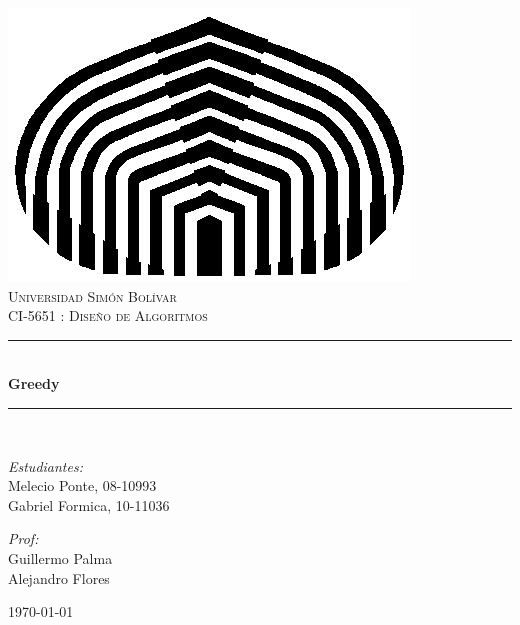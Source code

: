\documentclass[a4paper,14pt,spanish]{article}
\newcommand{\HRule}{\rule{\linewidth}{0.5mm}}
\begin{document}
\begin{titlepage}
\begin{center}
\includegraphics[scale=0.25]{res/USB.jpg}~\\[1cm]

\textsc{\LARGE Universidad Simón Bolívar}\\[1.5cm]
\textsc{\Large CI-5651 : Diseño de Algoritmos}\\[1.5cm]

\HRule \\[0.4cm]
{ \huge \bfseries Greedy\\[0.4cm] }

\HRule \\[1.5cm]
\begin{minipage}{0.4\textwidth}
\begin{flushleft} \large
\emph{Estudiantes:}\\
Melecio Ponte, 08-10993 \\
Gabriel Formica, 10-11036 \\
\end{flushleft}
\end{minipage}
\begin{minipage}{0.4\textwidth}
\begin{flushright} \large
\emph{Prof:} \\
Guillermo Palma \\
Alejandro Flores \\

\end{flushright}
\end{minipage}

\vfill
{\large \today}
\end{center}
\end{titlepage}

\tableofcontents
\newpage

\setlength\parindent{24pt}
\end{document}
